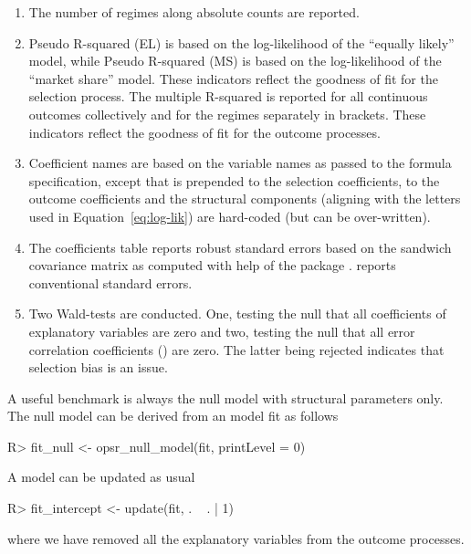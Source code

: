\documentclass[%
    twoside, openright, titlepage, numbers=noenddot,%
    cleardoublepage=empty,%
    abstract=false,%
    BCOR=5.5mm, paper=a5, fontsize=10pt,%
]{scrreprt}
\begin{document}
\begin{enumerate}
\item The number of regimes along absolute counts are reported.
\item Pseudo R-squared (EL) is based on the log-likelihood of the ``equally likely'' model, while Pseudo R-squared (MS) is based on the log-likelihood of the ``market share'' model. These indicators reflect the goodness of fit for the selection process. The multiple R-squared is reported for all continuous outcomes collectively and for the regimes separately in brackets. These indicators reflect the goodness of fit for the outcome processes.
\item Coefficient names are based on the variable names as passed to the formula specification, except that  is prepended to the selection coefficients,  to the outcome coefficients and the structural components  (aligning with the letters used in Equation~\ref{eq:log-lik}) are hard-coded (but can be over-written).
\item The coefficients table reports robust standard errors based on the sandwich covariance matrix as computed with help of the  package \citep{Zeileis:2006}.  reports conventional standard errors.
\item Two Wald-tests are conducted. One, testing the null that all coefficients of explanatory variables are zero and two, testing the null that all error correlation coefficients () are zero. The latter being rejected indicates that selection bias is an issue.
\end{enumerate}

A useful benchmark is always the null model with structural parameters only. The null model can be derived from an  model fit as follows
%
\begin{Schunk}
\begin{Sinput}
R> fit_null <- opsr_null_model(fit, printLevel = 0)
\end{Sinput}
\end{Schunk}
%
A model can be updated as usual
%
\begin{Schunk}
\begin{Sinput}
R> fit_intercept <- update(fit, . ~ . | 1)
\end{Sinput}
\end{Schunk}
%
where we have removed all the explanatory variables from the outcome processes.
\end{document}
